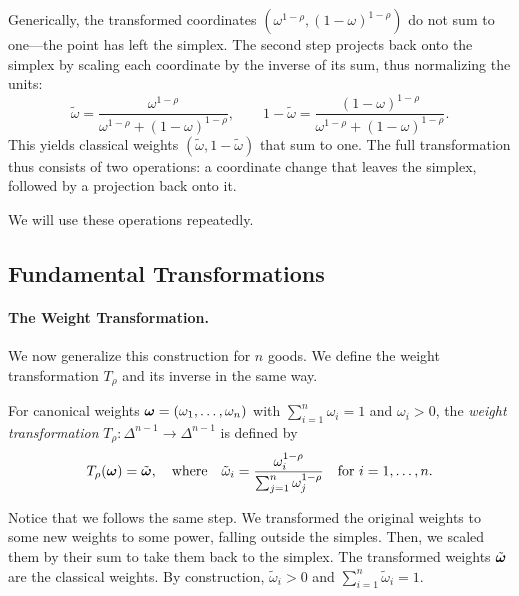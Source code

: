 Generically, the transformed coordinates $(\omega^{1-\rho}, (1-\omega)^{1-\rho})$ do not sum to one---the point has left the simplex. The second step projects back onto the simplex by scaling each coordinate by the inverse of its sum, thus normalizing the units:
\[
\tilde{\omega} = \frac{\omega^{1-\rho}}{\omega^{1-\rho} + (1-\omega)^{1-\rho}}, \qquad 1 - \tilde{\omega} = \frac{(1-\omega)^{1-\rho}}{\omega^{1-\rho} + (1-\omega)^{1-\rho}}.
\]
This yields classical weights $(\tilde{\omega}, 1-\tilde{\omega})$ that sum to one. The full transformation thus consists of two operations: a coordinate change that leaves the simplex, followed by a projection back onto it. 

We will use these operations repeatedly. 

\subsection{Fundamental Transformations}
\paragraph{The Weight Transformation.}

We now generalize this construction for $n$ goods. We define the weight transformation $T_\rho$ and its inverse in the same way.

\begin{definition}
\label{def:weight-transform}
For canonical weights $\boldsymbol{\omega} = (\omega_1, \ldots, \omega_n)$ with $\sum_{i=1}^n \omega_i = 1$ and $\omega_i > 0$, the \emph{weight transformation} $T_\rho: \Delta^{n-1} \to \Delta^{n-1}$ is defined by
\begin{equation}
\label{eq:T-rho-forward}
T_\rho(\boldsymbol{\omega}) = \tilde{\boldsymbol{\omega}}, \quad \text{where} \quad \tilde{\omega}_i = \frac{\omega_i^{1-\rho}}{\sum_{j=1}^{n} \omega_j^{1-\rho}} \quad \text{for } i = 1, \ldots, n.
\end{equation}
\end{definition}
Notice that we follows the same step. We transformed the original weights to some new weights to some power, falling outside the simples. Then, we scaled them by their sum to take them back to the simplex. The transformed weights $\tilde{\boldsymbol{\omega}}$ are the classical weights. By construction, $\tilde{\omega}_i > 0$ and $\sum_{i=1}^n \tilde{\omega}_i = 1$.


